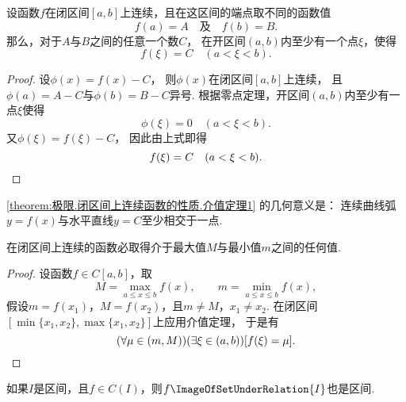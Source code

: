 \begin{theorem}[介值定理]\label{theorem:极限.闭区间上连续函数的性质.介值定理1}
设函数\(f\)在闭区间\([a,b]\)上连续，且在这区间的端点取不同的函数值\begin{equation*}
	f(a) = A
	\quad\text{及}\quad
	f(b) = B.
\end{equation*}
那么，对于\(A\)与\(B\)之间的任意一个数\(C\)，
在开区间\((a,b)\)内至少有一个点\(\xi\)，使得\begin{equation*}
	f(\xi)=C
	\quad(a<\xi<b).
\end{equation*}
\begin{proof}
设\(\phi(x)=f(x)-C\)，
则\(\phi(x)\)在闭区间\([a,b]\)上连续，
且\(\phi(a)=A-C\)与\(\phi(b)=B-C\)异号.
根据零点定理，开区间\((a,b)\)内至少有一点\(\xi\)使得\begin{equation*}
	\phi(\xi)=0
	\quad(a<\xi<b).
\end{equation*}
又\(\phi(\xi)=f(\xi)-C\)，
因此由上式即得\begin{equation*}
	f(\xi)=C
	\quad(a<\xi<b).
	\qedhere
\end{equation*}
\end{proof}
\end{theorem}
\cref{theorem:极限.闭区间上连续函数的性质.介值定理1} 的几何意义是：
连续曲线弧\(y=f(x)\)与水平直线\(y=C\)至少相交于一点.

\begin{corollary}\label{theorem:极限.闭区间上连续函数的性质.介值定理2}
在闭区间上连续的函数必取得介于最大值\(M\)与最小值\(m\)之间的任何值.
\begin{proof}
设函数\(f \in C[a,b]\)，取\begin{equation*}
	M=\max_{a \leq x \leq b} f(x), \qquad
	m=\min_{a \leq x \leq b} f(x),
\end{equation*}
假设\(m=f(x_1)\)，\(M=f(x_2)\)，且\(m \neq M\)，\(x_1 \neq x_2\).
在闭区间\([\min\{x_1,x_2\},\max\{x_1,x_2\}]\)上应用介值定理，
于是有\begin{equation*}
	(\forall\mu\in(m,M))(\exists\xi\in(a,b))
	[f(\xi)=\mu].
	\qedhere
\end{equation*}
\end{proof}
\end{corollary}

\begin{corollary}
如果\(I\)是区间，且\(f\in C(I)\)，则\(f\ImageOfSetUnderRelation{I}\)也是区间.
\end{corollary}

